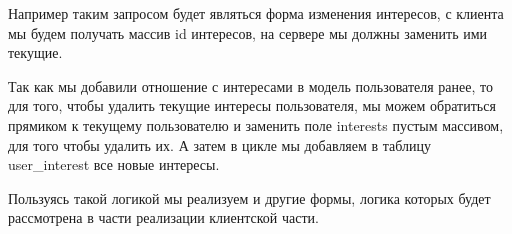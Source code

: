 Например таким запросом будет являться форма изменения интересов, с клиента мы будем получать массив id интересов, на сервере мы должны заменить ими текущие.


Так как мы добавили отношение с интересами в модель пользователя ранее, то для того, чтобы удалить текущие интересы пользователя, мы можем обратиться прямиком к текущему пользователю и заменить поле interests пустым массивом, для того чтобы удалить их. А затем в цикле мы добавляем в таблицу user\_interest все новые интересы.

Пользуясь такой логикой мы реализуем и другие формы, логика которых будет рассмотрена в части реализации клиентской части.
